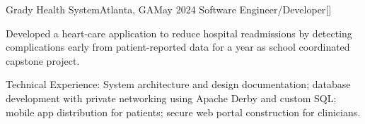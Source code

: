 \newpage
\begin{resume-itemize}
  {Grady Health System}{Atlanta, GA}{May 2024}
  {Software Engineer/Developer}[\href{https://github.com/ExtraneousFalcon/JIE-3342-HeartFailureApp}{}]
  \item Developed a heart-care application to reduce 
  hospital readmissions by detecting complications early from 
  patient-reported data for a year as school coordinated capstone project.
  \item Technical Experience: System architecture and design documentation; 
  database development with private networking using Apache Derby and custom SQL; 
  mobile app distribution for patients; secure web portal construction for clinicians.
\end{resume-itemize}
